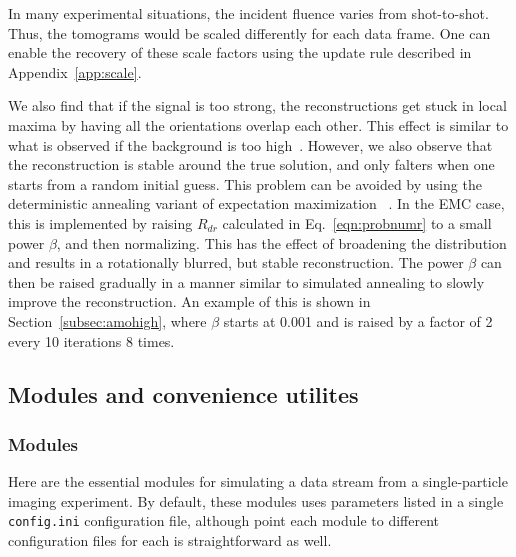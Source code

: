\documentclass[]{iucr}              %
\begin{document}
In many experimental situations, the incident fluence varies from shot-to-shot. Thus, the tomograms would be scaled differently for each data frame. One can enable the recovery of these scale factors using the update rule described in Appendix~\ref{app:scale}. 

We also find that if the signal is too strong, the reconstructions get stuck in local maxima by having all the orientations overlap each other. This effect is similar to what is observed if the background is too high~\cite{ayyer2015}. However, we also observe that the reconstruction is stable around the true solution, and only falters when one starts from a random initial guess. This problem can be avoided by using the deterministic annealing variant of expectation maximization ~\cite{ueda1998}. In the EMC case, this is implemented by raising $R_{dr}$ calculated in Eq.~\ref{eqn:probnumr} to a small power $\beta$, and then normalizing. This has the effect of broadening the distribution and results in a rotationally blurred, but stable reconstruction. The power $\beta$ can then be raised gradually in a manner similar to simulated annealing to slowly improve the reconstruction. An example of this is shown in Section~\ref{subsec:amohigh}, where $\beta$ starts at 0.001 and is raised by a factor of 2 every 10 iterations 8 times.

\subsection{Modules and convenience utilites}
\label{subsec:mod+utils}
\subsubsection{Modules}
Here are the essential modules for simulating a data stream from a single-particle imaging experiment. By default, these modules uses parameters listed in a single \texttt{config.ini} configuration file, although point each module to different configuration files for each is straightforward as well.
\end{document}
